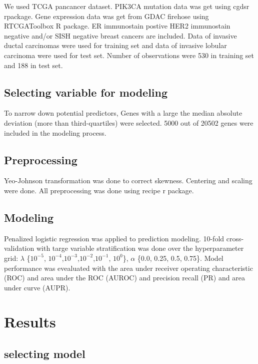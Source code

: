 \documentclass[10pt,letterpaper]{article}
\begin{document}
We used TCGA pancancer dataset. PIK3CA mutation data was get using cgdsr
rpackage. Gene expression data was get from GDAC firehose using
RTCGAToolbox R package. ER immunostain postive HER2 immunostain negative
and/or SISH negative breast cancers are included. Data of invasive
ductal carcinomas were used for training set and data of invasive
lobular carcinoma were used for test set. Number of observations were
530 in training set and 188 in test set.

\hypertarget{selecting-variable-for-modeling}{%
\subsection{Selecting variable for
modeling}\label{selecting-variable-for-modeling}}

To narrow down potential predictors, Genes with a large the median
absolute deviation (more than third-quartiles) were selected. 5000 out
of 20502 genes were included in the modeling process.

\hypertarget{preprocessing}{%
\subsection{Preprocessing}\label{preprocessing}}

Yeo-Johnson transformation was done to correct skewness. Centering and
scaling were done. All preprocessing was done using recipe r package.

\hypertarget{modeling}{%
\subsection{Modeling}\label{modeling}}

Penalized logistic regression was applied to prediction modeling.
10-fold cross-validation with targe variable stratification was done
over the hyperparameter grid: \(\lambda\) \{\(10^{-5}\),
\(10^{-4}\),\(10^{-3}\),\(10^{-2}\),\(10^{-1}\), \(10^{0}\)\},
\(\alpha\) \{0.0, 0.25, 0.5, 0.75\}. Model performance was evealuated
with the area under receiver operating characteristic (ROC) and area
under the ROC (AUROC) and precision recall (PR) and area under curve
(AUPR).

\hypertarget{results}{%
\section{Results}\label{results}}

\hypertarget{selecting-model}{%
\subsection{selecting model}\label{selecting-model}}
\end{document}

